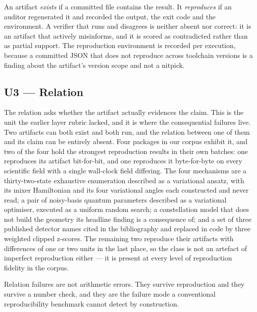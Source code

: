 \documentclass[sigconf,review]{acmart}
\begin{document}
An artifact \emph{exists} if a committed file contains the result.
It \emph{reproduces} if an auditor regenerated it and recorded the output,
the exit code and the environment. A verifier that runs and disagrees is
neither absent nor correct: it is an artifact that actively misinforms, and
it is scored as contradicted rather than as partial support. The reproduction
environment is recorded per execution, because a committed JSON that does not
reproduce across toolchain versions is a finding about the artifact's version
scope and not a nitpick.

\subsection{U3 --- Relation}
\label{sec:model-relation}

The relation asks whether the artifact actually evidences the claim. This is
the unit the earlier layer rubric lacked, and it is where the consequential
failures live. Two artifacts can both exist and both run, and the relation
between one of them and its claim can be entirely absent. Four packages in our
corpus exhibit it, and two of the four hold the strongest reproduction results
in their own batches: one reproduces its artifact bit-for-bit, and one
reproduces it byte-for-byte on every scientific field with a single wall-clock
field differing. The four mechanisms are a thirty-two-state
exhaustive enumeration described as a variational ansatz, with its mixer
Hamiltonian and its four variational angles each constructed and never read;
a pair of noisy-basis quantum parameters described as a variational
optimiser, executed as a uniform random search; a constellation model that
does not build the geometry its headline finding is a consequence of; and a set
of three published detector names cited in the bibliography and replaced in
code by three weighted clipped z-scores. The remaining two reproduce their
artifacts with differences of one or two units in the last place, so the class
is not an artefact of imperfect reproduction either --- it is present at every
level of reproduction fidelity in the corpus.

Relation failures are not arithmetic errors. They survive reproduction and
they survive a number check, and they are the failure mode a conventional
reproducibility benchmark cannot detect by construction.
\end{document}
